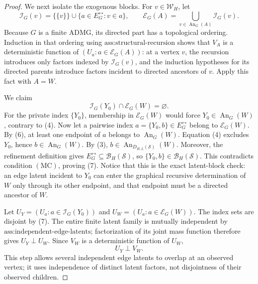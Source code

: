 \documentclass{article}
\begin{document}
\begin{proof}
We next isolate the exogenous blocks.  For \(v\in\mathcal W_H\), let
\[
\mathcal I_G(v)=\bigl\{\{v\}\bigr\}\cup
\bigl\{a\in E_G^{\leftrightarrow}:v\in a\bigr\},
\qquad
\mathcal E_G(A)=\bigcup_{v\in\operatorname{An}_G(A)}\mathcal I_G(v).
\tag{6}
\]
Because \(G\) is a finite ADMG, its directed part has a topological ordering.  Induction in that ordering using \(\text{ass:structural-recursion}\) shows that \(V_A\) is a deterministic function of \((U_a:a\in\mathcal E_G(A))\): at a vertex \(v\), the recursion introduces only factors indexed by \(\mathcal I_G(v)\), and the induction hypotheses for its directed parents introduce factors incident to directed ancestors of \(v\).  Apply this fact with \(A=W\).

We claim
\[
\mathcal I_G(Y_0)\cap\mathcal E_G(W)=\varnothing.
\tag{7}
\]
For the private index \(\{Y_0\}\), membership in \(\mathcal E_G(W)\) would force \(Y_0\in\operatorname{An}_G(W)\), contrary to (4).  Now let a pairwise index \(a=\{Y_0,b\}\in E_G^{\leftrightarrow}\) belong to \(\mathcal E_G(W)\).  By (6), at least one endpoint of \(a\) belongs to \(\operatorname{An}_G(W)\).  Equation (4) excludes \(Y_0\), hence \(b\in\operatorname{An}_G(W)\).  By (3), \(b\in\operatorname{An}_{D_{H,L}(\mathcal S)}(W)\).  Moreover, the refinement definition gives \(E_G^{\leftrightarrow}\subseteq\mathcal B_H(\mathcal S)\), so \(\{Y_0,b\}\in\mathcal B_H(\mathcal S)\).  This contradicts condition \(\mathrm{(MC)}\), proving (7).  Notice that this is the exact latent-block check: an edge latent incident to \(Y_0\) can enter the graphical recursive determination of \(W\) only through its other endpoint, and that endpoint must be a directed ancestor of \(W\).

Let \(U_Y=(U_a:a\in\mathcal I_G(Y_0))\) and \(U_W=(U_a:a\in\mathcal E_G(W))\).  The index sets are disjoint by (7).  The entire finite latent family is mutually independent by \(\text{ass:independent-edge-latents}\); factorization of its joint mass function therefore gives \(U_Y\perp U_W\).  Since \(V_W\) is a deterministic function of \(U_W\),
\[
U_Y\perp V_W.
\tag{8}
\]
This step allows several independent edge latents to overlap at an observed vertex; it uses independence of distinct latent factors, not disjointness of their observed children.


\end{proof}
\end{document}
